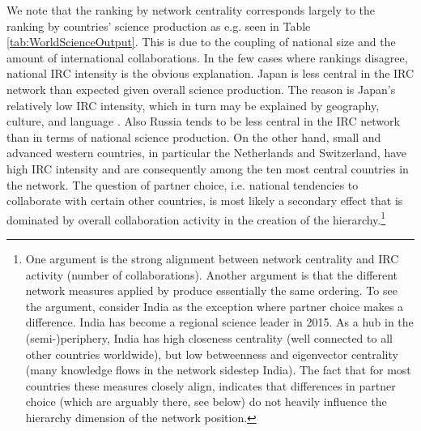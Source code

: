 We note that the ranking by network centrality corresponds largely to the ranking by countries' science production as e.g. seen in Table \ref{tab:WorldScienceOutput}. This is due to the coupling of national size and the amount of international collaborations. In the few cases where rankings disagree, national IRC intensity is the obvious explanation. Japan is less central in the IRC network than expected given overall science production. The reason is Japan's relatively low IRC intensity, which in turn may be explained by geography, culture, and language \citep{yonezawa2011internationalization}. Also Russia tends to be less central in the IRC network than in terms of national science production. On the other hand, small and advanced western countries, in particular the Netherlands and Switzerland, have high IRC intensity and are consequently among the ten most central countries in the network. The question of partner choice, i.e. national tendencies to collaborate with certain other countries, is most likely a secondary effect that is dominated by overall collaboration activity in the creation of the hierarchy.\footnote{One argument is the strong alignment between network centrality and IRC activity (number of collaborations). Another argument is that the different network measures applied by \cite{gui2018international} produce essentially the same ordering. To see the argument, consider India as the exception where partner choice makes a difference. India has become a regional science leader in 2015. As a hub in the (semi-)periphery, India has high closeness centrality (well connected to all other countries worldwide), but low betweenness and eigenvector centrality (many knowledge flows in the network sidestep India). The fact that for most countries these measures closely align, indicates that differences in partner choice (which are arguably there, see below) do not heavily influence the hierarchy dimension of the network position.}

